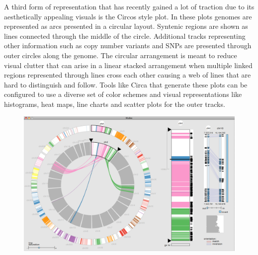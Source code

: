 A third form of representation that has recently gained a lot of traction due to its aesthetically appealing visuals is the Circos style plot\cite{krzywinski2009circos}. In these plots genomes are represented as arcs presented in a circular layout. Syntenic regions are shown as lines connected through the middle of the circle. Additional tracks representing other information such as copy number variants and SNPs are presented through outer circles along the genome. The circular arrangement is meant to reduce visual clutter that can arise in a linear stacked arrangement when multiple linked regions represented through lines cross each other causing a web of lines that are hard to distinguish and follow. Tools like Circa that generate these plots can be configured to use a diverse set of color schemes and visual representations like histograms, heat maps, line charts and scatter plots for the outer tracks\cite{circa}. 

\begin{figure}
  \centering
  \includegraphics[width=0.75\linewidth]{images/ch_2_mizbee.PNG}
  \label{fig:ch_2_mizbee}
\end{figure}

